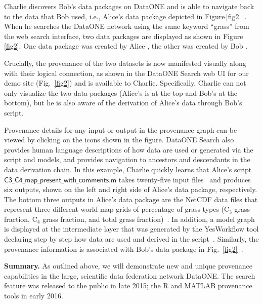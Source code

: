 \documentclass[a4paper]{llncs}
\newcommand{\mypara}[1]{\vspace{4pt}\noindent\textbf{#1}}
\newcommand{\code}[1]{\ensuremath{\mathsf{#1}}}
\newcommand{\Figref}[1]{Figure\,\ref{#1}}
\begin{document}
Charlie discovers Bob's data packages on DataONE and is able to navigate back to the data that Bob used, i.e., Alice's data package depicted in \Figref{fig2}~\cite{Katz,data-trajectories}. When he searches the DataONE network using the same keyword ``grass'' from the web search interface, two data packages are displayed as shown in \Figref{fig2}. One data package was created by Alice \cite{yaxing}, the other was created by Bob \cite{christopher}.

Crucially, the provenance of the two datasets is now manifested visually along with their logical connection, as shown in the DataONE Search web UI for our demo site \cite{dataone-demo} (Fig.~\ref{fig2}) and is available to Charlie. Specifically, Charlie can not only visualize the two data packages (Alice's is at the top and Bob's at the bottom), but he is also aware of the derivation of Alice's data through Bob's script.

Provenance details for any input or output in the provenance graph can be viewed by clicking on the icons shown in the figure. %
DataONE Search also provides human language descriptions of how data are used or generated via the script and models, and provides navigation to ancestors and descendants in the data derivation chain.
%
In this example, Charlie quickly learns that Alice's script \code{C3\_C4\_map\_present\_with\_comments.m} takes twenty-five input files~\cite{MsTMIP-model-driver-data-set} and produces six outputs, shown on the left and right side of Alice's data package, respectively. The bottom three outputs in Alice's data package are the NetCDF data files that represent three different world map grids of percentage of grass types (C$_3$ grass fraction, C$_4$ grass fraction, and total grass fraction)~\cite{MsTMIP-model-driver-data-set}. In addition, a model graph is displayed at the intermediate layer that was generated by the YesWorkflow tool declaring step by step how data are used and derived in the script~\cite{yesworkflow}. Similarly, the provenance information is associated with Bob's data package in Fig.~\ref{fig2}~\cite{christopher,dataone-prov-tech-report-2016,MsTMIP-model-output-data-set}.



\mypara{Summary.}  As outlined above, we will demonstrate new and unique provenance capabilities in the large, scientific data federation network DataONE. The search feature was released to the public in late 2015; the R and MATLAB provenance tools in early 2016.



\end{document}
